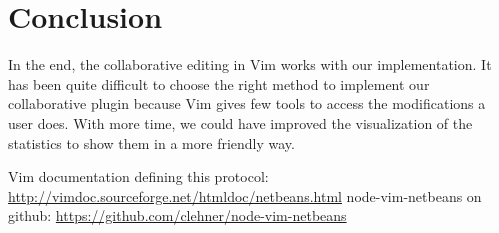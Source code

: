 \documentclass{llncs}
\begin{document}
\section{Conclusion}\label{sec:Conclusion}

In the end, the collaborative editing in Vim works with our implementation.
It has been quite difficult to choose the right method to implement our collaborative plugin
because Vim gives few tools to access the modifications a user does. With more time,
we could have improved the visualization of the statistics to show them in a more friendly way.

\begin{thebibliography}{1}

Vim documentation defining this protocol: \url{http://vimdoc.sourceforge.net/htmldoc/netbeans.html}
node-vim-netbeans on github: \url{https://github.com/clehner/node-vim-netbeans}

\end{thebibliography}
\end{document}
